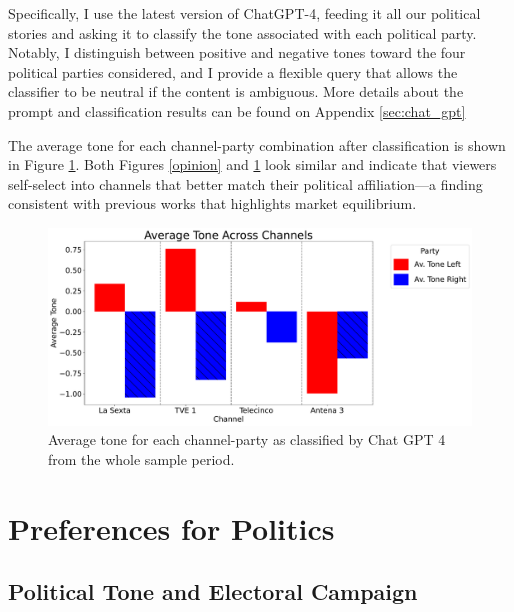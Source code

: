 \documentclass[12pt]{article}
\begin{document}
	Specifically, I use the latest version of ChatGPT-4, feeding it all our political stories and asking it to classify the tone associated with each political party. Notably, I distinguish between positive and negative tones toward the four political parties considered, and I provide a flexible query that allows the classifier to be neutral if the content is ambiguous. More details about the prompt and classification results can be found on Appendix \ref{sec:chat_gpt}
	
	The average tone for each channel-party combination after classification is shown in Figure \ref{fig:chat}. Both Figures \ref{opinion} and \ref{fig:chat} look similar and indicate that viewers self-select into channels that better match their political affiliation—a finding consistent with previous works \citep{gentzkow2011competition} that highlights market equilibrium.
	
	
	
	
	\begin{figure}[h!]
		\centering
		\includegraphics[width=160mm]{figures/chatgpt}
		\caption{Average tone for each channel-party as classified by Chat GPT 4 from the whole sample period. }
		\label{fig:chat}
	\end{figure}
	
	
	
	
	
	
	
	
	
	
	
	
	
	\section{Preferences for Politics}\label{section:politics}
	
	\subsection{Political Tone and Electoral Campaign}
	
\end{document}
